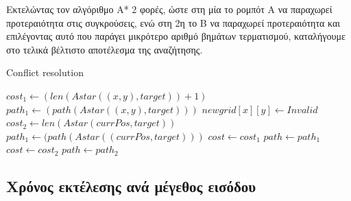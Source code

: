 \documentclass[a4paper,9pt]{article}
\begin{document}
Εκτελώντας τον αλγόριθμο A* 2 φορές, ώστε στη μία το ρομπότ A να παραχωρεί
προτεραιότητα στις συγκρούσεις, ενώ στη 2η το Β να παραχωρεί προτεραιότητα και
επιλέγοντας αυτό που παράγει μικρότερο αριθμό βημάτων τερματισμού, καταλήγουμε
στο τελικά βέλτιστο αποτέλεσμα της αναζήτησης.

\begin{algorithm}[H]
    \caption{Conflict resolution}
    \begin{algorithmic}[1]
        \State $cost_1 \gets (len(Astar((x,y), target)) + 1)$
        \State $path_1 \gets (path(Astar((x,y), target)))$
        \State $newgrid[x][y] \gets Invalid$
        \State $cost_2 \gets len(Astar(currPos, target))$
        \State $path_1 \gets (path(Astar((currPos, target)))$
        \State $cost \gets cost_1$
        \State $path \gets path_1$
        \Else
        \State $cost \gets cost_2$
        \State $path \gets path_2$
    \EndIf
\EndIf
\EndProcedure
\end{algorithmic}
\end{algorithm}


\pagebreak


\subsection{Χρόνος εκτέλεσης ανά μέγεθος εισόδου}
\end{document}
